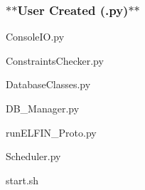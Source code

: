 \subsubsection*{$\ast$$\ast$\-User Created (.py)$\ast$$\ast$}


\begin{DoxyItemize}
\item Console\-I\-O.\-py
\item Constraints\-Checker.\-py
\item Database\-Classes.\-py
\item D\-B\-\_\-\-Manager.\-py
\item run\-E\-L\-F\-I\-N\-\_\-\-Proto.\-py
\item Scheduler.\-py
\item start.\-sh 
\end{DoxyItemize}